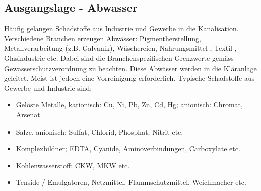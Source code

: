 \documentclass[9pt, openright=false]{scrartcl}
\begin{document}
\subsection{Ausgangslage - Abwasser}
Häufig gelangen Schadstoffe aus Industrie und Gewerbe in die Kanalisation. Verschiedene Branchen erzeugen Abwässer: Pigmentherstellung, Metallverarbeitung (z.B. Galvanik), Wäschereien, Nahrungsmittel-, Textil-, Glasindustrie etc. Dabei sind die Branchenspezifischen Grenzwerte gemäss Gewässerschutzverordnung zu beachten. Diese Abwässer werden in die Kläranlage geleitet. Meist ist jedoch eine Vorreinigung erforderlich. Typische Schadstoffe aus Gewerbe und Industrie sind:
\begin{itemize}
\item Gelöste Metalle, kationisch: Cu, Ni, Pb, Zn, Cd, Hg; anionisch: Chromat, Arsenat
\item Salze, anionisch: Sulfat, Chlorid, Phosphat, Nitrit etc.
\item Komplexbildner; EDTA, Cyanide, Aminoverbindungen, Carboxylate etc.
\item Kohlenwasserstoff: CKW, MKW etc.
\item Tenside / Emulgatoren, Netzmittel, Flammschutzmittel, Weichmacher etc.
\end{itemize}
\end{document}
